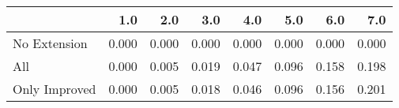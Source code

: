 \begin{tabular}{lrrrrrrr}
\toprule
{} &   1.0 &   2.0 &   3.0 &   4.0 &   5.0 &   6.0 &   7.0 \\
\midrule
No Extension  & 0.000 & 0.000 & 0.000 & 0.000 & 0.000 & 0.000 & 0.000 \\
All           & 0.000 & 0.005 & 0.019 & 0.047 & 0.096 & 0.158 & 0.198 \\
Only Improved & 0.000 & 0.005 & 0.018 & 0.046 & 0.096 & 0.156 & 0.201 \\
\bottomrule
\end{tabular}
